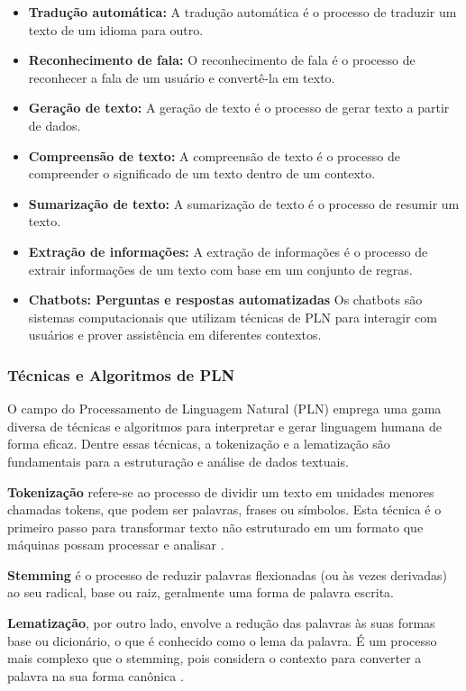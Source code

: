 \documentclass[conference]{IEEEtran}
\begin{document}
\begin{itemize}
    \item {\textbf{Tradução automática:}}
    A tradução automática é o processo de traduzir um texto de um idioma para outro. 
    \item {\textbf{Reconhecimento de fala:}}
    O reconhecimento de fala é o processo de reconhecer a fala de um usuário e convertê-la em texto.
    \item {\textbf{Geração de texto:}}
    A geração de texto é o processo de gerar texto a partir de dados.
    \item {\textbf{Compreensão de texto:}}
    A compreensão de texto é o processo de compreender o significado de um texto dentro de um contexto.
    \item {\textbf{Sumarização de texto:}}
    A sumarização de texto é o processo de resumir um texto.
    \item {\textbf{Extração de informações:}}
    A extração de informações é o processo de extrair informações de um texto com base em um conjunto de regras.
    \item {\textbf{Chatbots: Perguntas e respostas automatizadas}}
    Os chatbots são sistemas computacionais que utilizam técnicas de PLN para interagir com usuários e prover assistência em diferentes contextos.
\end{itemize}



\subsubsection{Técnicas e Algoritmos de PLN}
O campo do Processamento de Linguagem Natural (PLN) emprega uma gama diversa de 
técnicas e algoritmos para interpretar e gerar linguagem humana de forma eficaz. 
Dentre essas técnicas, a tokenização e a lematização são fundamentais para a 
estruturação e análise de dados textuais.

\textbf{Tokenização} refere-se ao processo de dividir um texto em unidades menores chamadas tokens, 
que podem ser palavras, frases ou símbolos. 
Esta técnica é o primeiro passo para transformar texto não estruturado em um formato 
que máquinas possam processar e analisar \cite{Manning2014}.

\textbf{Stemming} é o processo de reduzir palavras flexionadas (ou às vezes derivadas) ao seu
radical, base ou raiz, geralmente uma forma de palavra escrita.

\textbf{Lematização}, por outro lado, envolve a redução das palavras às suas formas base ou dicionário, 
o que é conhecido como o lema da palavra. 
É um processo mais complexo que o stemming, pois considera o contexto para 
converter a palavra na sua forma canônica \cite{Bird2009}.
\end{document}
